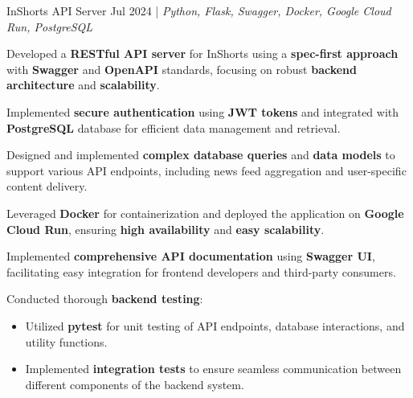\resumeSubheadings
    {InShorts API Server  \space {}}{Jul 2024}
    {}{}{| \textit{Python, Flask, Swagger, Docker, Google Cloud Run, PostgreSQL}}
    \resumeItemListStart
    \item Developed a \textbf{RESTful API server} for InShorts using a \textbf{spec-first approach} with \textbf{Swagger} and \textbf{OpenAPI} standards, focusing on robust \textbf{backend architecture} and \textbf{scalability}.
    \item Implemented \textbf{secure authentication} using \textbf{JWT tokens} and integrated with \textbf{PostgreSQL} database for efficient data management and retrieval.
    \item Designed and implemented \textbf{complex database queries} and \textbf{data models} to support various API endpoints, including news feed aggregation and user-specific content delivery.
    \item Leveraged \textbf{Docker} for containerization and deployed the application on \textbf{Google Cloud Run}, ensuring \textbf{high availability} and \textbf{easy scalability}.
    \item Implemented \textbf{comprehensive API documentation} using \textbf{Swagger UI}, facilitating easy integration for frontend developers and third-party consumers.
    \item Conducted thorough \textbf{backend testing}:
      \begin{itemize}
        \item Utilized \textbf{pytest} for unit testing of API endpoints, database interactions, and utility functions.
        \item Implemented \textbf{integration tests} to ensure seamless communication between different components of the backend system.
      \end{itemize}
    \resumeItemListEnd